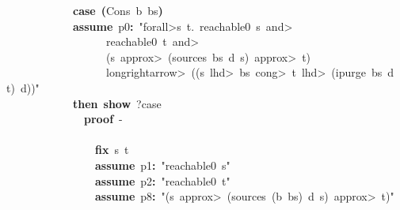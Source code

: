 \documentclass{article}
\newcommand{\syntaxKEYWORDA}[1]{\textcolor[rgb]{0.0,0.4,0.6}{\textbf{#1}}}
\newcommand{\syntaxKEYWORDC}[1]{\textcolor[rgb]{0.0,0.6,1.0}{\textbf{#1}}}
\newcommand{\syntaxLITERALA}[1]{\textcolor[rgb]{1.0,0.0,0.8}{#1}}
\newcommand{\syntaxOPERATOR}[1]{\textcolor[rgb]{0.0,0.0,0.0}{\textbf{#1}}}
\newcommand{\syntaxKEYWORDA}[1]{\textcolor[rgb]{0.0,0.4,0.6}{\textbf{#1}}}
\newcommand{\syntaxKEYWORDC}[1]{\textcolor[rgb]{0.0,0.6,1.0}{\textbf{#1}}}
\newcommand{\syntaxLITERALA}[1]{\textcolor[rgb]{1.0,0.0,0.8}{#1}}
\newcommand{\syntaxOPERATOR}[1]{\textcolor[rgb]{0.0,0.0,0.0}{\textbf{#1}}}
\newcommand{\syntaxKEYWORDA}[1]{\textcolor[rgb]{0.0,0.4,0.6}{\textbf{#1}}}
\newcommand{\syntaxKEYWORDC}[1]{\textcolor[rgb]{0.0,0.6,1.0}{\textbf{#1}}}
\newcommand{\syntaxLITERALA}[1]{\textcolor[rgb]{1.0,0.0,0.8}{#1}}
\newcommand{\syntaxOPERATOR}[1]{\textcolor[rgb]{0.0,0.0,0.0}{\textbf{#1}}}
\newcommand{\syntaxKEYWORDA}[1]{\textcolor[rgb]{0.0,0.4,0.6}{#1}}
\newcommand{\syntaxKEYWORDC}[1]{\textcolor[rgb]{0.0,0.6,1.0}{#1}}
\newcommand{\syntaxLITERALA}[1]{\textcolor[rgb]{1.0,0.0,0.8}{\textbf{#1}}}
\newcommand{\syntaxOPERATOR}[1]{\textcolor[rgb]{0.0,0.0,0.0}{#1}}
\newcommand{\syntaxKEYWORDA}[1]{\textcolor[rgb]{0.0,0.4,0.6}{\textbf{#1}}}
\newcommand{\syntaxKEYWORDC}[1]{\textcolor[rgb]{0.0,0.6,1.0}{\textbf{#1}}}
\newcommand{\syntaxLITERALA}[1]{\textcolor[rgb]{1.0,0.0,0.8}{#1}}
\newcommand{\syntaxOPERATOR}[1]{\textcolor[rgb]{0.0,0.0,0.0}{\textbf{#1}}}
\newcommand{\syntaxKEYWORDA}[1]{\textcolor[rgb]{0.0,0.4,0.6}{\textbf{#1}}}
\newcommand{\syntaxKEYWORDC}[1]{\textcolor[rgb]{0.0,0.6,1.0}{\textbf{#1}}}
\newcommand{\syntaxLITERALA}[1]{\textcolor[rgb]{1.0,0.0,0.8}{#1}}
\newcommand{\syntaxOPERATOR}[1]{\textcolor[rgb]{0.0,0.0,0.0}{\textbf{#1}}}
\begin{document}
{\ }{\ }{\ }{\ }{\ }{\ }{\ }{\ }{\ }{\ }{\ }{\ }\syntaxKEYWORDC{case}{\ }\syntaxOPERATOR{(}Cons{\ }b{\ }bs\syntaxOPERATOR{)}\hspace*{\fill}\\
{\ }{\ }{\ }{\ }{\ }{\ }{\ }{\ }{\ }{\ }{\ }{\ }\syntaxKEYWORDC{assume}{\ }p0\syntaxOPERATOR{:}{\ }\syntaxLITERALA{"\<forall>s{\ }t.{\ }reachable0{\ }s{\ }\<and>}\hspace*{\fill}\\
\syntaxLITERALA{{\ }{\ }{\ }{\ }{\ }{\ }{\ }{\ }{\ }{\ }{\ }{\ }{\ }{\ }{\ }{\ }{\ }{\ }reachable0{\ }t{\ }\<and>}\hspace*{\fill}\\
\syntaxLITERALA{{\ }{\ }{\ }{\ }{\ }{\ }{\ }{\ }{\ }{\ }{\ }{\ }{\ }{\ }{\ }{\ }{\ }{\ }(s{\ }\<approx>{\ }(sources{\ }bs{\ }d{\ }s){\ }\<approx>{\ }t)}\hspace*{\fill}\\
\syntaxLITERALA{{\ }{\ }{\ }{\ }{\ }{\ }{\ }{\ }{\ }{\ }{\ }{\ }{\ }{\ }{\ }{\ }{\ }{\ }\<longrightarrow>{\ }((s{\ }\<lhd>{\ }bs{\ }\<cong>{\ }t{\ }\<lhd>{\ }(ipurge{\ }bs{\ }d{\ }{\ }t){\ }\usebox{\atbox}{\ }d))"}\hspace*{\fill}\\
{\ }{\ }{\ }{\ }{\ }{\ }{\ }{\ }{\ }{\ }{\ }{\ }\syntaxKEYWORDA{then}{\ }\syntaxKEYWORDC{show}{\ }?case\hspace*{\fill}\\
{\ }{\ }{\ }{\ }{\ }{\ }{\ }{\ }{\ }{\ }{\ }{\ }{\ }{\ }\syntaxKEYWORDA{proof}{\ }{-}\hspace*{\fill}\\
{\ }{\ }{\ }{\ }{\ }{\ }{\ }{\ }{\ }{\ }{\ }{\ }{\ }{\ }\syntaxKEYWORDA{\usebox{\opencurlybracket}}{\ }\hspace*{\fill}\\
{\ }{\ }{\ }{\ }{\ }{\ }{\ }{\ }{\ }{\ }{\ }{\ }{\ }{\ }{\ }{\ }\syntaxKEYWORDC{fix}{\ }s{\ }t\hspace*{\fill}\\
{\ }{\ }{\ }{\ }{\ }{\ }{\ }{\ }{\ }{\ }{\ }{\ }{\ }{\ }{\ }{\ }\syntaxKEYWORDC{assume}{\ }p1\syntaxOPERATOR{:}{\ }\syntaxLITERALA{"reachable0{\ }s"}\hspace*{\fill}\\
{\ }{\ }{\ }{\ }{\ }{\ }{\ }{\ }{\ }{\ }{\ }{\ }{\ }{\ }{\ }{\ }\syntaxKEYWORDC{assume}{\ }p2\syntaxOPERATOR{:}{\ }\syntaxLITERALA{"reachable0{\ }t"}\hspace*{\fill}\\
{\ }{\ }{\ }{\ }{\ }{\ }{\ }{\ }{\ }{\ }{\ }{\ }{\ }{\ }{\ }{\ }\syntaxKEYWORDC{assume}{\ }p8\syntaxOPERATOR{:}{\ }\syntaxLITERALA{"(s{\ }\<approx>{\ }(sources{\ }(b{\ }\usebox{\hashbox}{\ }bs){\ }d{\ }s){\ }\<approx>{\ }t)"}\hspace*{\fill}\\
\end{document}
